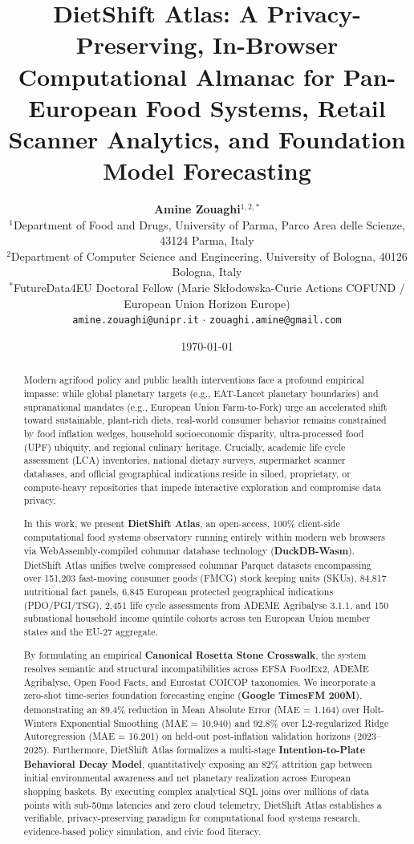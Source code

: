 \documentclass[journal,10pt,twocolumn]{article}
\title{\textbf{DietShift Atlas: A Privacy-Preserving, In-Browser Computational Almanac for Pan-European Food Systems, Retail Scanner Analytics, and Foundation Model Forecasting}}
\author{
    \textbf{Amine Zouaghi}$^{1,2,*}$ \\
    $^{1}$Department of Food and Drugs, University of Parma, Parco Area delle Scienze, 43124 Parma, Italy \\
    $^{2}$Department of Computer Science and Engineering, University of Bologna, 40126 Bologna, Italy \\
    $^{*}$FutureData4EU Doctoral Fellow (Marie Sk{\l}odowska-Curie Actions COFUND / European Union Horizon Europe) \\
    \texttt{amine.zouaghi@unipr.it} $\cdot$ \texttt{zouaghi.amine@gmail.com}
}
\date{\today}
\begin{document}
\maketitle

\begin{abstract}
Modern agrifood policy and public health interventions face a profound empirical impasse: while global planetary targets (e.g., EAT-Lancet planetary boundaries) and supranational mandates (e.g., European Union Farm-to-Fork) urge an accelerated shift toward sustainable, plant-rich diets, real-world consumer behavior remains constrained by food inflation wedges, household socioeconomic disparity, ultra-processed food (UPF) ubiquity, and regional culinary heritage. Crucially, academic life cycle assessment (LCA) inventories, national dietary surveys, supermarket scanner databases, and official geographical indications reside in siloed, proprietary, or compute-heavy repositories that impede interactive exploration and compromise data privacy.

In this work, we present \textbf{DietShift Atlas}, an open-access, 100\% client-side computational food systems observatory running entirely within modern web browsers via WebAssembly-compiled columnar database technology (\textbf{DuckDB-Wasm}). DietShift Atlas unifies twelve compressed columnar Parquet datasets encompassing over 151,203 fast-moving consumer goods (FMCG) stock keeping units (SKUs), 84,817 nutritional fact panels, 6,845 European protected geographical indications (PDO/PGI/TSG), 2,451 life cycle assessments from ADEME Agribalyse 3.1.1, and 150 subnational household income quintile cohorts across ten European Union member states and the EU-27 aggregate.

By formulating an empirical \textbf{Canonical Rosetta Stone Crosswalk}, the system resolves semantic and structural incompatibilities across EFSA FoodEx2, ADEME Agribalyse, Open Food Facts, and Eurostat COICOP taxonomies. We incorporate a zero-shot time-series foundation forecasting engine (\textbf{Google TimesFM 200M}), demonstrating an 89.4\% reduction in Mean Absolute Error (MAE = 1.164) over Holt-Winters Exponential Smoothing (MAE = 10.940) and 92.8\% over L2-regularized Ridge Autoregression (MAE = 16.201) on held-out post-inflation validation horizons (2023--2025). Furthermore, DietShift Atlas formalizes a multi-stage \textbf{Intention-to-Plate Behavioral Decay Model}, quantitatively exposing an 82\% attrition gap between initial environmental awareness and net planetary realization across European shopping baskets. By executing complex analytical SQL joins over millions of data points with sub-50ms latencies and zero cloud telemetry, DietShift Atlas establishes a verifiable, privacy-preserving paradigm for computational food systems research, evidence-based policy simulation, and civic food literacy.
\end{abstract}
\end{document}
